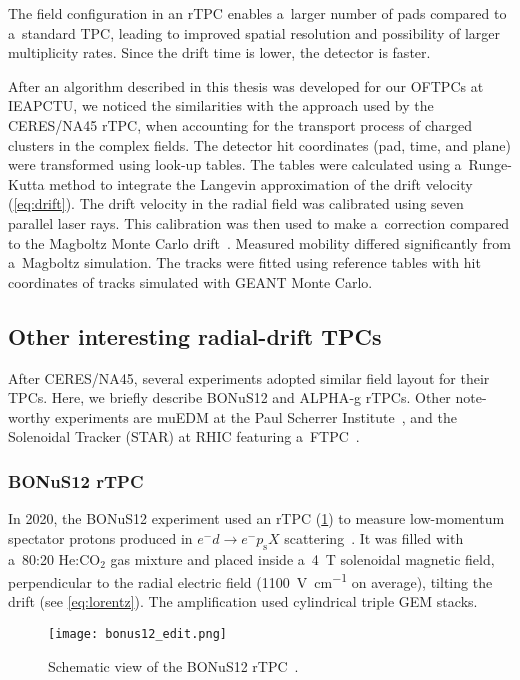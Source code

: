 			The field configuration in an \ac{rTPC} enables a~larger number of pads compared to a~standard \ac{TPC}, leading to improved spatial resolution and possibility of larger multiplicity rates. Since the drift time is lower, the detector is faster.
			
			After an algorithm described in this thesis was developed for our \acp{OFTPC} at \ac{IEAPCTU}, we noticed the similarities with the approach used by the CERES/NA45 \ac{rTPC}, when accounting for the transport process of charged clusters in the complex fields. The detector hit coordinates (pad, time, and plane) were transformed using look\nobreakdash-up tables. The tables were calculated using a~Runge-Kutta method to integrate the Langevin approximation of the drift velocity (\cref{eq:drift}). The drift velocity in the radial field was calibrated using seven parallel laser rays. This calibration was then used to make a~correction compared to the Magboltz Monte Carlo drift~\cite{magboltz}. Measured mobility differed significantly from a~Magboltz simulation. The tracks were fitted using reference tables with hit coordinates of tracks simulated with GEANT Monte Carlo.
			
		\subsection{Other interesting radial-drift TPCs}
			After CERES/NA45, several experiments adopted similar field layout for their \acp{TPC}. Here, we briefly describe \acs{BONuS12} and \acs{ALPHA}\nobreakdash-g \acsp{rTPC}. Other note-worthy experiments are \ac{muEDM} at the Paul Scherrer Institute~\cite{muEDM}, and the Solenoidal Tracker (STAR) at \ac{RHIC} featuring a~\ac{FTPC}~\cite{STAR}.
			\subsubsection{BONuS12 rTPC}
				In 2020, the \acf{BONuS12} experiment used an \ac{rTPC} (\cref{fig:bonus}) to measure low-momentum spectator protons produced in $e^- d \rightarrow e^- p_\text{s}X$ scattering~\cite{bonus}. It was filled with a~80:20 He:CO$_2$ gas mixture and placed inside a~\qty{4}{\tesla} solenoidal magnetic field, perpendicular to the radial electric field (\qty{1100}{\V\per\cm} on average), tilting the drift (see \cref{eq:lorentz}). The amplification used cylindrical triple \ac{GEM} stacks.
				
				\begin{figure}
					\centering
					\texttt{[image: bonus12\_edit.png]}
					\caption{Schematic view of the \ac{BONuS12} \ac{rTPC}~\cite{bonus}.}
					\label{fig:bonus}
				\end{figure}
				
